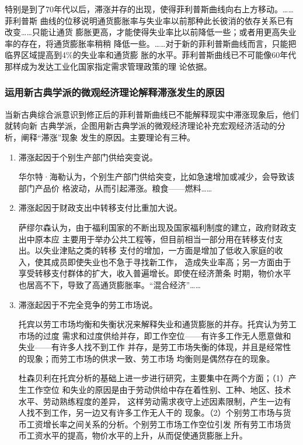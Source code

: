 特别是到了70年代以后，滞涨并存的出现，使得菲利普斯曲线向右上方移动。……菲利普斯
曲线的位移说明通货膨胀率与失业率以前那种此长彼消的依存关系已有改变……只能让通货
膨胀更高，才能使得失业率比以前降低一些；或者用更高失业率的存在，将通货膨胀率稍稍
降低一些。……对于新的菲利普斯曲线而言，只能把临界区域提高到4\%的失业率和通货膨
胀的水平。菲利普斯曲线已不可能像60年代那样成为发达工业化国家指定需求管理政策的理
论依据。

\subsubsection{运用新古典学派的微观经济理论解释滞涨发生的原因}

当新古典综合派意识到修正后的菲利普斯曲线已不能解释现实中滞涨现象后，他们就转向新
古典学派，企图用新古典学派的微观经济理论补充宏观经济活动的分析，阐释“滞涨”现象
发生的原因。主要理论有三种。

\begin{enumerate}
\item 滞涨起因于个别生产部门供给突变说。

  华尔特·海勒认为，个别生产部门供给突变，比如急速增加或减少，会导致该部门产品价
  格波动，从而引起滞涨。粮食——燃料……


\item 滞涨起因于财政支出中转移支付比重加大说。

  萨缪尔森认为，由于福利国家的不断出现及国家福利制度的建立，政府财政支出中原本应
  主要用于举办公共工程等，但目前相当一部分用在转移支付支出。以失业津贴之类的转移
  支付的增加，一方面是增加了低收入家庭的收入，使其成员即使失业也不急于寻找新工作，
  造成失业率高；另一方面由于享受转移支付群体的扩大，收入普遍增长。即使在经济萧条
  时期，物价水平也居高不下，导致了高通货膨胀率。“混合经济”……


\item 滞涨起因于不完全竞争的劳工市场说。

  托宾以劳工市场均衡和失衡状况来解释失业和通货膨胀的并存。托宾认为劳工市场的过度
  需求和过度供给并存，即工作空位——有许多工作无人愿意做和失业——有许多人找不到工作
  并存，是劳工市场失衡的体现，并且是经常性的现象；而劳工市场的供求一致、劳工市场
  均衡则是偶然存在的现象。

  杜森贝利在托宾分析的基础上进一步进行研究，主要集中在两个方面；（1）产生工作空位
  和失业的原因是由于劳动供给中存在着性别、工种、地区、技术水平、劳动熟练程度的差异，
  这样劳动需求夜守上述因素限制，产生一边有人找不到工作，另一边又有许多工作无人干的
  现象。（2）个别劳工市场与货币工资增长率之间关系的分析。个别劳工市场工作空位引发
  所有劳工市场货币工资水平的提高，物价水平的上升，从而促使通货膨胀上升。
\end{enumerate}


